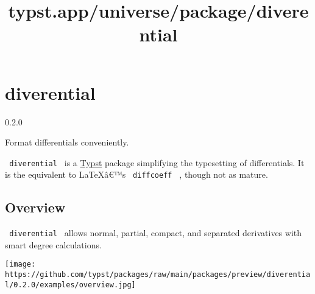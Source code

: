 \title{typst.app/universe/package/diverential}

\label{banner}
\section{diverential}\label{diverential}

{ 0.2.0 }

Format differentials conveniently.

\label{readme}
\texttt{\ diverential\ } is a
\href{https://github.com/typst/typst}{Typst} package simplifying the
typesetting of differentials. It is the equivalent to LaTeXâ€™s
\texttt{\ diffcoeff\ } , though not as mature.

\subsection{Overview}\label{overview}

\texttt{\ diverential\ } allows normal, partial, compact, and separated
derivatives with smart degree calculations.

\begin{Shaded}
\begin{Highlighting}[]
\NormalTok{\#} \OperatorTok{:} \OperatorTok{*}

\NormalTok{$ }\OperatorTok{,}\OperatorTok{,}\OperatorTok{:} \OperatorTok{,}\OperatorTok{:} \NormalTok{) $}
\NormalTok{$ }\OperatorTok{,}\OperatorTok{,}\OperatorTok{,}\OperatorTok{:} \OperatorTok{,}\OperatorTok{:} \StringTok{"["}\NormalTok{) $}
\NormalTok{$ }\OperatorTok{,}
\NormalTok{$ }\OperatorTok{,}\NormalTok{ \#([x]}\OperatorTok{,} \NormalTok{)}\OperatorTok{,}\NormalTok{ \#([y]}\OperatorTok{,}\NormalTok{ [n])}\OperatorTok{,}\NormalTok{ \#([z]}\OperatorTok{,}\NormalTok{ [m])}\OperatorTok{,}\OperatorTok{:} \NormalTok{) $}
\end{Highlighting}
\end{Shaded}

\texttt{[image: https://github.com/typst/packages/raw/main/packages/preview/diverential/0.2.0/examples/overview.jpg]}

